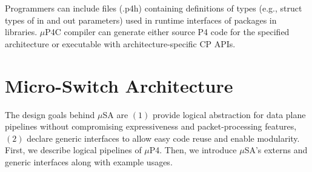 \documentclass{hotnets19}
\newcommand{\hs}[1]{{\color{blue}{HS:#1}}}
\begin{document}
Programmers can include files (.p4h) containing definitions of types (e.g., struct types of in and out parameters) used in runtime interfaces of packages in libraries.
$\mu$P4C compiler can generate either source P4 code for the specified architecture or executable with architecture-specific CP APIs.

\hs{next we describe msa and mp4c...}



\section{Micro-Switch Architecture}
\label{section:micros-awitch-architecture}
The design goals behind $\mu$SA are $(1)$ provide logical abstraction for data plane pipelines without compromising expressiveness and packet-processing features, $(2)$ declare generic interfaces to allow easy code reuse and enable modularity.
First, we describe logical pipelines of $\mu$P4. Then, we introduce $\mu$SA's externs and generic interfaces along with example usages.



\end{document}

